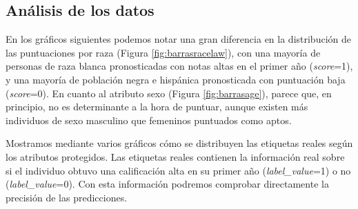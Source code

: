 \subsection*{Análisis de los datos}

En los gráficos siguientes podemos notar una gran diferencia en la distribución de las puntuaciones por raza (Figura \ref{fig:barrasracelaw}), con una mayoría de personas de raza blanca pronosticadas con notas altas en el primer año (\textit{score}=1), y una mayoría de población negra e hispánica pronosticada con puntuación baja (\textit{score}=0). En cuanto al atributo sexo (Figura \ref{fig:barrasage}), parece que, en principio, no es determinante a la hora de puntuar, aunque existen más individuos de sexo masculino que femeninos puntuados como aptos.

Mostramos mediante varios gráficos cómo se distribuyen las etiquetas reales según los atributos protegidos. Las etiquetas reales contienen la información real sobre si el individuo obtuvo una calificación alta en su primer año (\textit{label\_value}=1) o no (\textit{label\_value}=0). Con esta información podremos comprobar directamente la precisión de las predicciones.

\clearpage

